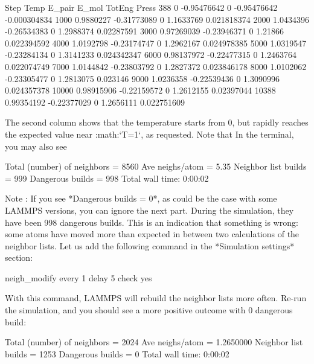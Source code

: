 \begin{lcverbatim}
Step         Temp       E_pair        E_mol       TotEng        Press
388            0  -0.95476642            0  -0.95476642 -0.000304834
1000    0.9880227  -0.31773089            0    1.1633769  0.021818374 
2000    1.0434396  -0.26534383            0    1.2988374   0.02287591 
3000   0.97269039  -0.23946371            0      1.21866  0.022394592 
4000    1.0192798  -0.23174747            0    1.2962167  0.024978385 
5000    1.0319547  -0.23284134            0    1.3141233  0.024342347 
6000   0.98137972  -0.22477315            0    1.2463764  0.022074749 
7000    1.0144842  -0.23803792            0    1.2827372  0.023846178 
8000    1.0102062  -0.23305477            0    1.2813075     0.023146 
9000    1.0236358  -0.22539436            0    1.3090996  0.024357378 
10000   0.98915906  -0.22159572            0    1.2612155   0.02397044 
10388   0.99354192  -0.22377029            0    1.2656111  0.022751609 
\end{lcverbatim}

The second column shows that the temperature
starts from 0, but rapidly reaches the
expected value near :math:`T=1`, as requested. 
Note that  In the terminal, you may also see

\begin{lcverbatim}
Total (number) of neighbors = 8560
Ave neighs/atom = 5.35
Neighbor list builds = 999
Dangerous builds = 998
Total wall time: 0:00:02
\end{lcverbatim}

Note : If you see *Dangerous builds = 0*, as could be
the case with some LAMMPS versions, you can ignore
the next part.
During the simulation, they have been 998 dangerous builds.
This is an indication that something is wrong: some atoms
have moved more than expected in between two calculations of
the neighbor lists. Let us add the following command in the
*Simulation settings* section:

\begin{lcverbatim}
neigh_modify every 1 delay 5 check yes
\end{lcverbatim}

With this command, LAMMPS will rebuild the neighbor lists
more often. Re-run the simulation, and you should see a more
positive outcome with 0 dangerous build:

\begin{lcverbatim}
Total (number) of neighbors = 2024
Ave neighs/atom = 1.2650000
Neighbor list builds = 1253
Dangerous builds = 0
Total wall time: 0:00:02
\end{lcverbatim}


